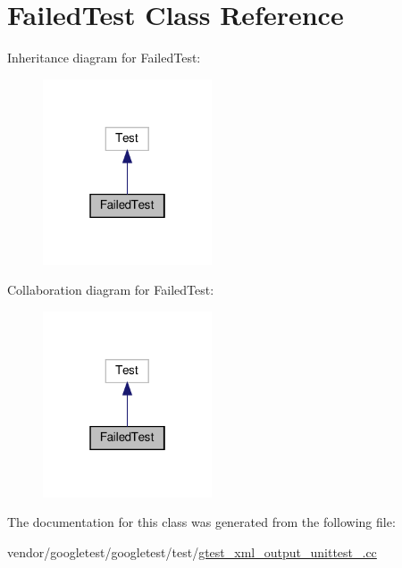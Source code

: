 \hypertarget{class_failed_test}{}\section{Failed\+Test Class Reference}
\label{class_failed_test}


Inheritance diagram for Failed\+Test\+:
\nopagebreak
\begin{figure}[H]
\begin{center}
\leavevmode
\includegraphics[width=142pt]{class_failed_test__inherit__graph}
\end{center}
\end{figure}


Collaboration diagram for Failed\+Test\+:
\nopagebreak
\begin{figure}[H]
\begin{center}
\leavevmode
\includegraphics[width=142pt]{class_failed_test__coll__graph}
\end{center}
\end{figure}


The documentation for this class was generated from the following file\+:\begin{DoxyCompactItemize}
\item 
vendor/googletest/googletest/test/\hyperlink{gtest__xml__output__unittest___8cc}{gtest\+\_\+xml\+\_\+output\+\_\+unittest\+\_\+.\+cc}\end{DoxyCompactItemize}
